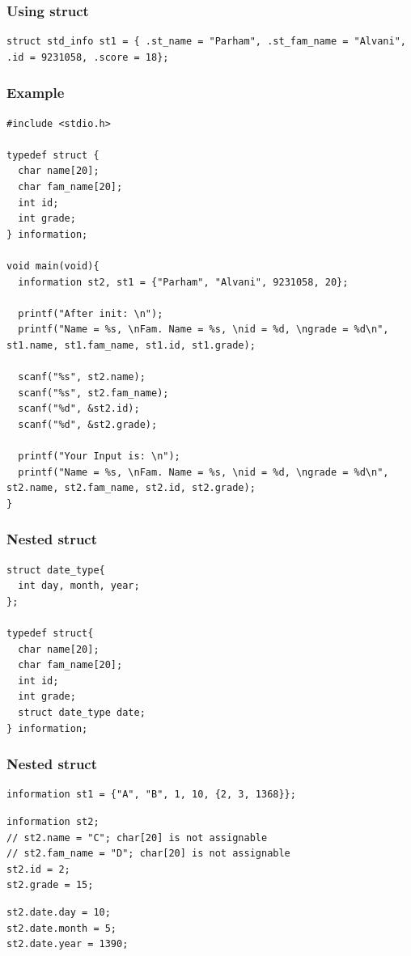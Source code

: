 \documentclass{../c-lecture}
\begin{document}
\begin{frame}[fragile]
  \frametitle{Using struct}
  \begin{verbatim}
struct std_info st1 = { .st_name = "Parham", .st_fam_name = "Alvani", .id = 9231058, .score = 18};
  \end{verbatim}
\end{frame}

\begin{frame}[fragile]
  \frametitle{Example}
  \scriptsize
  \begin{verbatim}
#include <stdio.h>

typedef struct {
  char name[20];
  char fam_name[20];
  int id;
  int grade;
} information;

void main(void){
  information st2, st1 = {"Parham", "Alvani", 9231058, 20};

  printf("After init: \n");
  printf("Name = %s, \nFam. Name = %s, \nid = %d, \ngrade = %d\n", st1.name, st1.fam_name, st1.id, st1.grade);

  scanf("%s", st2.name);
  scanf("%s", st2.fam_name);
  scanf("%d", &st2.id);
  scanf("%d", &st2.grade);

  printf("Your Input is: \n");
  printf("Name = %s, \nFam. Name = %s, \nid = %d, \ngrade = %d\n", st2.name, st2.fam_name, st2.id, st2.grade);
}
  \end{verbatim}
\end{frame}

\begin{frame}[fragile]
  \frametitle{Nested struct}
  \scriptsize
  \begin{verbatim}
struct date_type{
  int day, month, year;
};

typedef struct{
  char name[20];
  char fam_name[20];
  int id;
  int grade;
  struct date_type date;
} information;
  \end{verbatim}
\end{frame}

\begin{frame}[fragile]
  \frametitle{Nested struct}
  \begin{verbatim}
information st1 = {"A", "B", 1, 10, {2, 3, 1368}};
  \end{verbatim}
  \begin{verbatim}
information st2;
// st2.name = "C"; char[20] is not assignable
// st2.fam_name = "D"; char[20] is not assignable
st2.id = 2;
st2.grade = 15;
  \end{verbatim}
  \begin{verbatim}
st2.date.day = 10;
st2.date.month = 5;
st2.date.year = 1390;
  \end{verbatim}
\end{frame}
\end{document}

